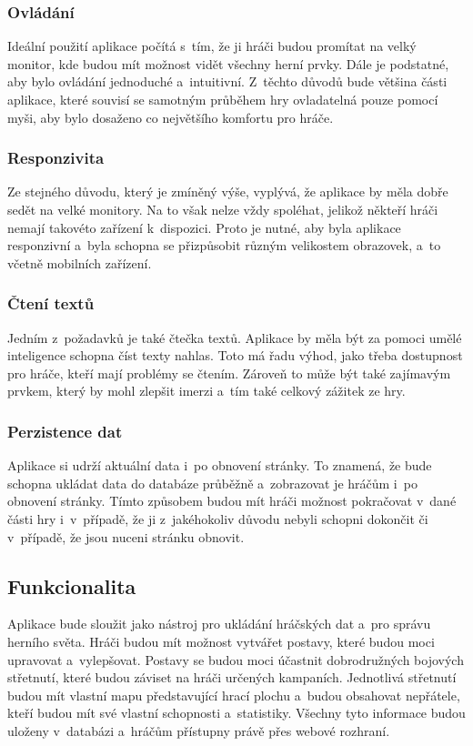 \subsubsection*{Ovládání}
Ideální použití aplikace počítá s~tím, že ji hráči budou promítat na velký monitor, kde budou mít možnost vidět všechny herní prvky. Dále je podstatné, aby bylo ovládání jednoduché a~intuitivní. Z~těchto důvodů bude většina části aplikace, které souvisí se samotným průběhem hry ovladatelná pouze pomocí myši, aby bylo dosaženo co největšího komfortu pro hráče.

\subsubsection*{Responzivita}
Ze stejného důvodu, který je zmíněný výše, vyplývá, že aplikace by měla dobře sedět na velké monitory. Na to však nelze vždy spoléhat, jelikož někteří hráči nemají takovéto zařízení k~dispozici. Proto je nutné, aby byla aplikace responzivní a~byla schopna se přizpůsobit různým velikostem obrazovek, a~to včetně mobilních zařízení.

\subsubsection*{Čtení textů}
Jedním z~požadavků je také čtečka textů. Aplikace by měla být za pomoci umělé inteligence schopna číst texty nahlas. Toto má řadu výhod, jako třeba dostupnost pro hráče, kteří mají problémy se čtením. Zároveň to může být také zajímavým prvkem, který by mohl zlepšit imerzi a~tím také celkový zážitek ze hry.

\subsubsection*{Perzistence dat}
Aplikace si udrží aktuální data i~po obnovení stránky. To znamená, že bude schopna ukládat data do databáze průběžně a~zobrazovat je hráčům i~po obnovení stránky. Tímto způsobem budou mít hráči možnost pokračovat v~dané části hry i~v~případě, že ji z~jakéhokoliv důvodu nebyli schopni dokončit či v~případě, že jsou nuceni stránku obnovit.

\subsection{Funkcionalita}
Aplikace bude sloužit jako nástroj pro ukládání hráčských dat a~pro správu herního světa. Hráči budou mít možnost vytvářet postavy, které budou moci upravovat a~vylepšovat. Postavy se budou moci účastnit dobrodružných bojových střetnutí, které budou záviset na hráči určených kampaních. Jednotlivá střetnutí budou mít vlastní mapu představující hrací plochu a~budou obsahovat nepřátele, kteří budou mít své vlastní schopnosti a~statistiky. Všechny tyto informace budou uloženy v~databázi a~hráčům přístupny právě přes webové rozhraní.

